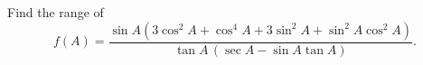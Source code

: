 Find the range of
\[f(A)=\dfrac{\sin A\left(3\cos^2A+\cos^4A+3\sin^2A+\sin^2A\cos^2A\right)}{\tan A\,(\sec A-\sin A\tan A)}.\]
